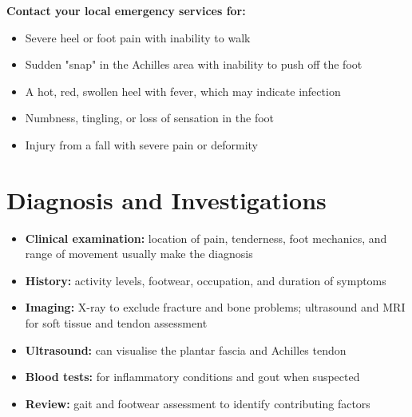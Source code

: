 \textbf{Contact your local emergency services for:}
\begin{itemize}
    \item Severe heel or foot pain with inability to walk
    \item Sudden "snap" in the Achilles area with inability to push off the foot
    \item A hot, red, swollen heel with fever, which may indicate infection
    \item Numbness, tingling, or loss of sensation in the foot
    \item Injury from a fall with severe pain or deformity
\end{itemize}

\section*{Diagnosis and Investigations}
\begin{itemize}
    \item \textbf{Clinical examination:} location of pain, tenderness, foot mechanics, and range of movement usually make the diagnosis
    \item \textbf{History:} activity levels, footwear, occupation, and duration of symptoms
    \item \textbf{Imaging:} X-ray to exclude fracture and bone problems; ultrasound and MRI for soft tissue and tendon assessment
    \item \textbf{Ultrasound:} can visualise the plantar fascia and Achilles tendon
    \item \textbf{Blood tests:} for inflammatory conditions and gout when suspected
    \item \textbf{Review:} gait and footwear assessment to identify contributing factors
\end{itemize}

